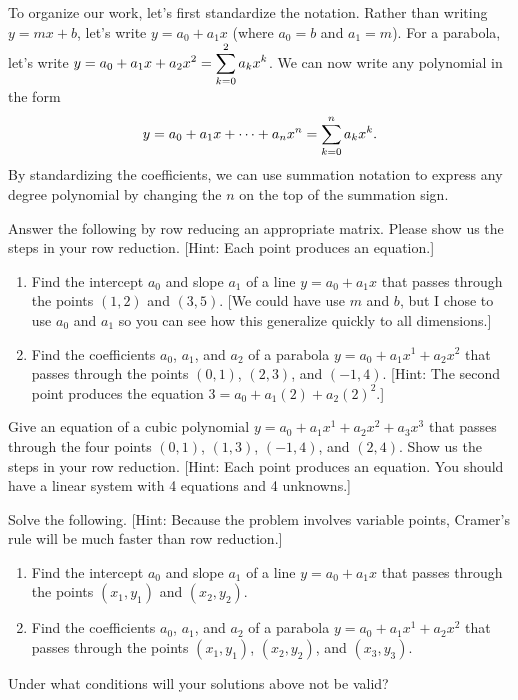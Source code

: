 To organize our work, let's first standardize the notation.  Rather than writing $y=mx+b$, let's write $y=a_0+a_1 x$ (where $a_0=b$ and $a_1=m$). For a parabola, let's write $\displaystyle y=a_0 + a_1 x+ a_2 x^2 = \sum_{k=0}^{2} a_k x^k$. We can now write any polynomial in the form $$\displaystyle y = a_0 + a_1 x+ \cdots + a_n x^n = \sum_{k=0}^n a_k x^k.$$ By standardizing the coefficients, we can use summation notation to express any degree polynomial by changing the $n$ on the top of the summation sign. 

\begin{problem}
 Answer the following by row reducing an appropriate matrix. Please show us the steps in your row reduction. [Hint: Each point produces an equation.]
\begin{enumerate}
 \item Find the intercept $a_0$ and slope $a_1$ of a line $y = a_0+a_1 x$ that passes through the points $(1,2)$ and $(3,5)$. [We could have use $m$ and $b$, but I chose to use $a_0$ and $a_1$ so you can see how this generalize quickly to all dimensions.]
 \item Find the coefficients $a_0$, $a_1$, and $a_2$ of a parabola $y = a_0+a_1 x^1+a_2x^2$ that passes through the points $(0, 1)$,  $(2, 3)$, and  $(−1, 4)$. [Hint: The second point produces the equation $3=a_0+a_1(2)+a_2(2)^2$.]
\end{enumerate}
\end{problem}

\begin{problem}
 Give an equation of a cubic polynomial $y = a_0+a_1x^1+a_2x^2+a_3x^3$ that passes through the four points $(0, 1)$, $(1, 3)$, $(−1, 4)$, and $(2, 4)$. Show us the steps in your row reduction. [Hint: Each point produces an equation.  You should have a linear system with 4 equations and 4 unknowns.]
\end{problem}


\begin{problem}
Solve the following. [Hint: Because the problem involves variable points, Cramer's rule will be much faster than row reduction.]
\begin{enumerate}
 \item Find the intercept $a_0$ and slope $a_1$ of a line $y = a_0+a_1 x$ that passes through the points $(x_1,y_1)$ and $(x_2,y_2)$. 
 \item Find the coefficients $a_0$, $a_1$, and $a_2$ of a parabola $y = a_0+a_1 x^1+a_2x^2$ that passes through the points $(x_1, y_1)$,  $(x_2, y_2)$, and  $(x_3, y_3)$.
\end{enumerate}
Under what conditions will your solutions above not be valid?
\end{problem}

